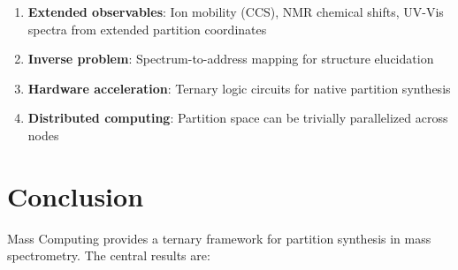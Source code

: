 \documentclass[twocolumn,10pt]{article}
\begin{document}
\begin{enumerate}[leftmargin=*]
\item \textbf{Extended observables}: Ion mobility (CCS), NMR chemical shifts, UV-Vis spectra from extended partition coordinates

\item \textbf{Inverse problem}: Spectrum-to-address mapping for structure elucidation

\item \textbf{Hardware acceleration}: Ternary logic circuits for native partition synthesis

\item \textbf{Distributed computing}: Partition space can be trivially parallelized across nodes
\end{enumerate}

\section{Conclusion}

Mass Computing provides a ternary framework for partition synthesis in mass spectrometry. The central results are:
\end{document}
